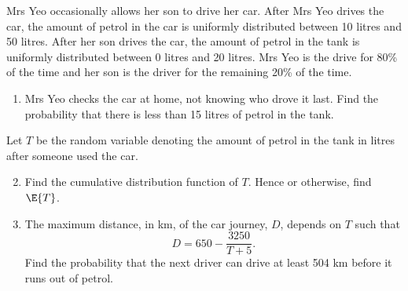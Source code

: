 \begin{problem}
    Mrs Yeo occasionally allows her son to drive her car. After Mrs Yeo drives the car, the amount of petrol in the car is uniformly distributed between 10 litres and 50 litres. After her son drives the car, the amount of petrol in the tank is uniformly distributed between 0 litres and 20 litres. Mrs Yeo is the drive for 80\% of the time and her son is the driver for the remaining 20\% of the time.

    \begin{enumerate}
        \item Mrs Yeo checks the car at home, not knowing who drove it last. Find the probability that there is less than 15 litres of petrol in the tank.
    \end{enumerate}

    Let $T$ be the random variable denoting the amount of petrol in the tank in litres after someone used the car.

    \begin{enumerate}
        \setcounter{enumi}{1}
        \item Find the cumulative distribution function of $T$. Hence or otherwise, find $\E{T}$.
        \item The maximum distance, in km, of the car journey, $D$, depends on $T$ such that \[D = 650 - \frac{3250}{T + 5}.\] Find the probability that the next driver can drive at least 504 km before it runs out of petrol.
    \end{enumerate}
\end{problem}
